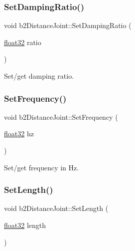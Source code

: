 \subsubsection{\texorpdfstring{SetDampingRatio()}{SetDampingRatio()}}
{\footnotesize\ttfamily void b2\+Distance\+Joint\+::\+Set\+Damping\+Ratio (\begin{DoxyParamCaption}\item[{\mbox{\hyperlink{b2_settings_8h_aacdc525d6f7bddb3ae95d5c311bd06a1}{float32}}}]{ratio }\end{DoxyParamCaption})\hspace{0.3cm}{\ttfamily [inline]}}



Set/get damping ratio. 

\mbox{\label{classb2_distance_joint_a1a12446f8926a1324edd481d9cd28c8a}} 
\subsubsection{\texorpdfstring{SetFrequency()}{SetFrequency()}}
{\footnotesize\ttfamily void b2\+Distance\+Joint\+::\+Set\+Frequency (\begin{DoxyParamCaption}\item[{\mbox{\hyperlink{b2_settings_8h_aacdc525d6f7bddb3ae95d5c311bd06a1}{float32}}}]{hz }\end{DoxyParamCaption})\hspace{0.3cm}{\ttfamily [inline]}}



Set/get frequency in Hz. 

\mbox{\label{classb2_distance_joint_a950a0f187ef691208e50de40ed9223fe}} 
\subsubsection{\texorpdfstring{SetLength()}{SetLength()}}
{\footnotesize\ttfamily void b2\+Distance\+Joint\+::\+Set\+Length (\begin{DoxyParamCaption}\item[{\mbox{\hyperlink{b2_settings_8h_aacdc525d6f7bddb3ae95d5c311bd06a1}{float32}}}]{length }\end{DoxyParamCaption})\hspace{0.3cm}{\ttfamily [inline]}}


